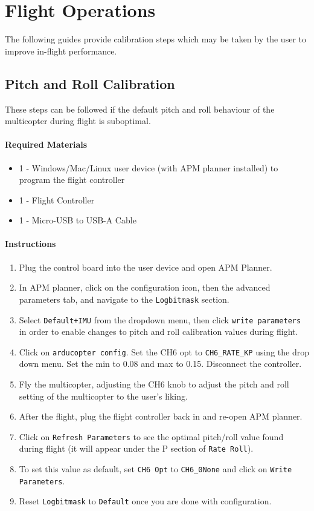 \documentclass[10pt,letterpaper]{article}
\begin{document}
\section{Flight Operations}
The following guides provide calibration steps which may be taken by the user to improve in-flight performance.

\subsection{Pitch and Roll Calibration}
These steps can be followed if the default pitch and roll behaviour of the multicopter during flight is suboptimal.

\paragraph{Required Materials}
\begin{itemize}
    \item 1 - Windows/Mac/Linux user device (with APM planner installed) to program the flight controller 
\item 1 - Flight Controller
\item 1 - Micro-USB to USB-A Cable
\end{itemize}

\paragraph{Instructions}
\begin{enumerate}
	\item Plug the control board into the user device and open APM Planner.
    \item In APM planner, click on the configuration icon, then the advanced parameters tab, and navigate to the \texttt{Logbitmask} section. 
    \item Select \texttt{Default+IMU} from the dropdown menu, then click \texttt{write parameters} in order to enable changes to pitch and roll calibration values during flight.
    \item Click on \texttt{arducopter config}. Set the CH6 opt to \texttt{CH6\_RATE\_KP} using the drop down menu. Set the min to 0.08 and max to 0.15. Disconnect the controller.
    \item Fly the multicopter, adjusting the CH6 knob to adjust the pitch and roll setting of the multicopter to the user's liking. 
    \item After the flight, plug the flight controller back in and re-open APM planner. 
    \item Click on \texttt{Refresh Parameters} to see the optimal pitch/roll value found during flight (it will appear under the P section of \texttt{Rate Roll}). 
    \item To set this value as default, set \texttt{CH6 Opt} to \texttt{CH6\_0None} and click on \texttt{Write Parameters}.
    \item Reset \texttt{Logbitmask} to \texttt{Default} once you are done with configuration.

\end{enumerate}
\end{document}
